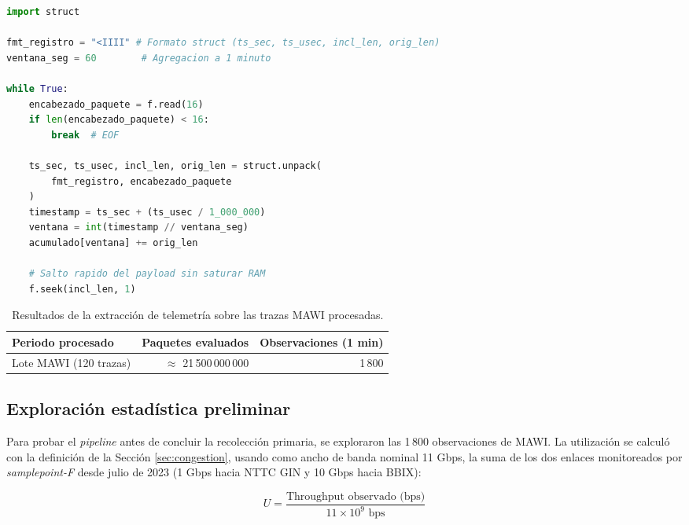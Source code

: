 \documentclass[12pt]{report}
\begin{document}
\begin{lstlisting}[language=Python, caption={Extracto del decodificador de trazas libpcap en flujo.}, label={lst:parser_pcap}]
import struct

fmt_registro = "<IIII" # Formato struct (ts_sec, ts_usec, incl_len, orig_len)
ventana_seg = 60        # Agregacion a 1 minuto

while True:
    encabezado_paquete = f.read(16)
    if len(encabezado_paquete) < 16:
        break  # EOF

    ts_sec, ts_usec, incl_len, orig_len = struct.unpack(
        fmt_registro, encabezado_paquete
    )
    timestamp = ts_sec + (ts_usec / 1_000_000)
    ventana = int(timestamp // ventana_seg)
    acumulado[ventana] += orig_len

    # Salto rapido del payload sin saturar RAM
    f.seek(incl_len, 1) 
\end{lstlisting}

\begin{table}[H]
    \centering
    \begin{tabular}{|l|r|r|}
        \hline
        \textbf{Periodo procesado} & \textbf{Paquetes evaluados} & \textbf{Observaciones (1 min)} \\
        \hline
        Lote MAWI (120 trazas) & $\approx$ 21\,500\,000\,000 & 1\,800 \\
        \hline
    \end{tabular}
    \caption{Resultados de la extracción de telemetría sobre las trazas MAWI procesadas.}
    \label{tab:resumen_extraccion_mawi}
\end{table}

\subsection*{Exploración estadística preliminar}

Para probar el \textit{pipeline} antes de concluir la recolección primaria, se exploraron las 1\,800 observaciones de MAWI. La utilización se calculó con la definición de la Sección \ref{sec:congestion}, usando como ancho de banda nominal 11 Gbps, la suma de los dos enlaces monitoreados por \textit{samplepoint-F} desde julio de 2023 (1 Gbps hacia NTTC GIN y 10 Gbps hacia BBIX):

\begin{equation}
    U = \frac{\mbox{Throughput observado (bps)}}{11 \times 10^{9} \mbox{ bps}}
    \label{eq:utilizacion_instanciada_mawi}
\end{equation}
\end{document}
